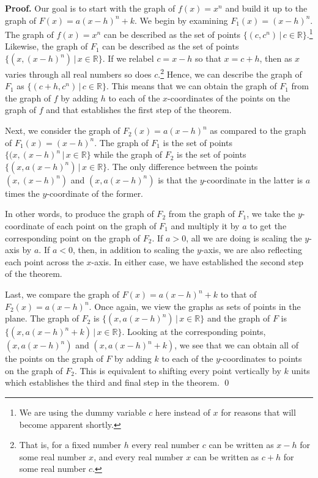 \documentclass{ximera}
\begin{document}


{\bf Proof.} Our goal is to start with the graph of $f(x) = x^n$ and build it up to the graph of $F(x) = a(x-h)^n+k$.  We begin by examining $F_{1}(x) = (x-h)^n$.  The graph of $f(x) = x^n$ can be described as the set of points $\{ (c, c^n) \, | \, c \in \mathbb{R} \}$.\footnote{We are using the dummy variable $c$ here instead of $x$ for reasons that will become apparent shortly.}  Likewise, the graph of $F_{1}$ can be described as the set of points $\{(x, (x-h)^n) \, | \, x \in \mathbb{R} \}$.   If we relabel $c =x-h$ so that $x = c+h$, then as $x$ varies through all real numbers so does $c$.\footnote{That is, for a fixed number $h$ every real number $c$ can be written as $x-h$ for some real number $x$, and every real number $x$ can be written as $c + h$ for some real number $c$.}   Hence, we can describe the graph of $F_{1}$ as $\{ (c+h, c^n) \, | \, c \in \mathbb{R} \}$. This means that we can obtain the graph of $F_{1}$ from the graph of $f$ by adding $h$ to each of the $x$-coordinates of the points on the graph of $f$ and that establishes the first step of the theorem.


Next, we consider the graph of $F_{2}(x) = a(x-h)^n$ as compared to the graph of $F_{1}(x) = (x-h)^n$.  The graph of $F_{1}$ is the set of points $\{ (x, (x-h)^n \, | \, x \in \mathbb{R} \}$ while the graph of $F_{2}$ is the set of points $\{ (x, a(x-h)^n) \, | \, x \in \mathbb{R} \}$.  The only difference between the points $(x, (x-h)^n)$ and $(x, a(x-h)^n)$ is that the $y$-coordinate in the latter is $a$ times the $y$-coordinate of the former.  


In other words, to produce the graph of $F_{2}$ from the graph of $F_{1}$, we take the $y$-coordinate of each point on the graph of $F_{1}$ and multiply it by $a$ to get the corresponding point on the graph of $F_{2}$.  If $a>0$, all we are doing is scaling the $y$-axis by $a$.  If $a<0$, then, in addition to scaling the $y$-axis, we are also reflecting each point across the $x$-axis.  In either case, we have established the second step of the theorem.


Last, we compare the graph of $F(x) = a(x-h)^n + k$ to that of $F_{2}(x) = a(x-h)^n$.  Once again, we view the graphs as sets of points in the plane.  The graph of $F_{2}$ is $\{ (x, a(x-h)^n) \, | \, x \in \mathbb{R} \}$ and the graph of $F$ is$\{ (x, a(x-h)^n+k) \, | \, x \in \mathbb{R} \}$.  Looking at the corresponding points, $(x, a(x-h)^n)$ and $(x, a(x-h)^n+k)$, we see that we can obtain all of the points on the graph of $F$ by adding $k$ to each of the $y$-coordinates to points on the graph of $F_{2}$. This is equivalent to  shifting every point vertically by $k$ units which establishes the third and final step in the theorem. \qed
\end{document}
